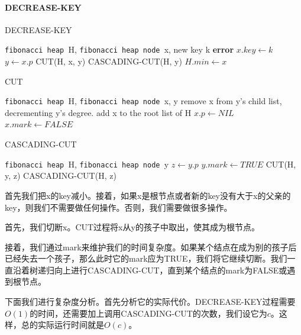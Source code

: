 \documentclass{ctexart}
\newcommand{\fibheap}{\texttt{fibonacci heap }}
\newcommand{\fibnode}{\texttt{fibonacci heap node }}
\begin{document}
\paragraph{DECREASE-KEY}
\begin{algorithm}
    \caption{DECREASE-KEY}
    \begin{algorithmic}[1]
        \Require \fibheap H, \fibnode x, new key k
            \State \textbf{error} 
        \EndIf
        \State $x.key \gets k$
        \State $y \gets x.p$
            \State CUT(H, x, y)
            \State CASCADING-CUT(H, y)
        \EndIf
            \State $H.min \gets x$
        \EndIf
    \end{algorithmic}
\end{algorithm}
\begin{algorithm}
    \caption{CUT}
    \begin{algorithmic}[1]
        \Require \fibheap H, \fibnode x, y
        \State remove x from y's child list, decrementing y's degree.
        \State add x to the root list of H
        \State $x.p \gets NIL$
        \State $x.mark \gets FALSE$
    \end{algorithmic}
\end{algorithm}
\begin{algorithm}
    \caption{CASCADING-CUT}
    \begin{algorithmic}[1]
        \Require \fibheap H, \fibnode y
        \State $z \gets y.p$
                \State $y.mark \gets TRUE$
            \Else
                \State CUT(H, y, z)
                \State CASCADING-CUT(H, z)
            \EndIf
        \EndIf
    \end{algorithmic}
\end{algorithm}
首先我们把x的key减小。接着，如果x是根节点或者新的key没有大于x的父亲的key，则我们不需要做任何操作。否则，我们需要做很多操作。

首先，我们切断x。CUT过程将x从y的孩子中取出，使其成为根节点。

接着，我们通过mark来维护我们的时间复杂度。如果某个结点在成为别的孩子后已经失去一个孩子，那么此时它的mark应为TRUE，我们将它继续切断。我们一直沿着树递归向上进行CASCADING-CUT，直到某个结点的mark为FALSE或遇到根节点。

下面我们进行复杂度分析。首先分析它的实际代价。DECREASE-KEY过程需要$O(1)$的时间，还需要加上调用CASCADING-CUT的次数，我们设它为$c$。这样，总的实际运行时间就是$O(c)$。
\end{document}
